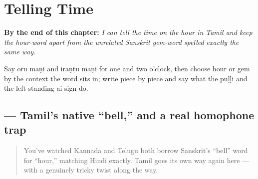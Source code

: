 
\chapter{Telling Time}
\label{ch:ta-telling-time}

\begin{chapteropening}
\textbf{By the end of this chapter:} \emph{I can tell the time on the hour in Tamil and keep the hour-word  apart from the unrelated Sanskrit gem-word spelled exactly the same way.}

Say oru maṇi and iraṇṭu maṇi for one and two o'clock, then choose hour or gem by the context the word sits in; write  piece by piece and say what the puḷḷi and the left-standing ai sign do.
\end{chapteropening}

\section[\texorpdfstring{\ta{மணி} (maṇi)}{மணி (maṇi)}]{ — Tamil's native \textquotedblleft{}bell,\textquotedblright{} and a real homophone trap}

\label{lesson:TA-C18-mani}



\begin{quote}
You've watched Kannada and Telugu both borrow Sanskrit's \textquotedblleft{}bell\textquotedblright{} word for \textquotedblleft{}hour,\textquotedblright{} matching Hindi exactly. Tamil goes its own way again here — with a genuinely tricky twist along the way.
\end{quote}


